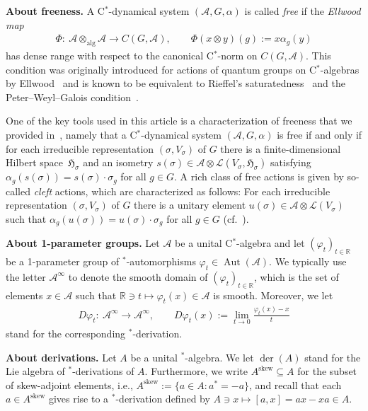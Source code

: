 \documentclass[10pt,a4paper]{amsart}
\numberwithin{equation}{section}
\newcommand*{\R}{\mathbb R}		%
\newcommand*{\tensor}{\otimes}		%
\DeclareMathOperator{\Aut}{Aut}
\DeclareMathOperator{\der}{der}
\newcommand*{\Star}{$^*$\nobreakdash}
\newcommand*{\hilb}{\mathfrak}		%
\newcommand*{\alg}{\mathcal}		%
\newcommand*{\hH}{\hilb{H}}			%
\newcommand*{\aA}{\alg{A}}			%
\newcommand*{\End}{\mathcal{L}} %
\newcommand*{\Cont}{C}
\begin{document}
{\bf About freeness.}
A C\Star-dynamical system $(\aA,G,\alpha)$ is called \emph{free} if the \emph{Ellwood map}
\begin{align*}
	\Phi\colon \ \aA \tensor_{\text{alg}} \aA \rightarrow C(G,\aA),
	\qquad
	\Phi(x\tensor y)(g):=x \alpha_g(y)
\end{align*}
has dense range with respect to the canonical C\Star-norm on $\Cont(G,\aA)$.
This condition was originally introduced for actions of quantum groups on C\Star-algebras by Ellwood~\cite{Ell00} and is known to be equivalent to Rieffel's saturatedness~\cite{Rieffel91} and the Peter--Weyl--Galois condition~\cite{BaCoHa15}.

One of the key tools used in this article is a characterization of freeness that we provided in~\cite[Lemma~3.3]{SchWa17c}, namely that a C\Star-dynamical system $(\aA,G,\alpha)$ is free if and only if for each irreducible representation $(\sigma,V_\sigma)$ of $G$ there is a finite-dimensional Hilbert space~$\hH_\sigma$ and an isometry $s(\sigma) \in \aA \tensor \End(V_\sigma,\hH_\sigma)$ satisfying $\alpha_g(s(\sigma))=s(\sigma) \cdot \sigma_g$ for all $g \in G$.
A rich class of free actions is given by so-called \emph{cleft} actions, which are characterized as follows:
For each irreducible representation $(\sigma,V_\sigma)$ of $G$ there is a unitary element \mbox{$u(\sigma) \in \aA \tensor \End(V_\sigma)$} such that $\alpha_g(u(\sigma))=u(\sigma) \cdot \sigma_g$ for all $g \in G$ (cf.~\cite[Definition~4.1]{SchWa17b}).

{\bf About 1-parameter groups.}
Let $\aA$ be a unital C\Star-algebra and let $(\varphi_t)_{t \in \R}$ be a 1\nobreakdash-parameter group of \Star-automorphisms $\varphi_t \in \Aut(\aA)$.
We typically use the letter $\aA^\infty$ to denote the smooth domain of $(\varphi_t)_{t \in \R}$, which is the set of elements $x \in \aA$ such that $\R \ni t \mapsto \varphi_t(x) \in \aA$ is smooth.
Moreover, we let
\begin{gather*}
	D \varphi_t \colon \ \aA^\infty \to \aA^\infty,
	\qquad
	D \varphi_t(x) := \lim_{t \to 0} \frac{\varphi_t(x)-x}{t}
\end{gather*}
stand for the corresponding \Star-derivation.

{\bf About derivations.}
Let $A$ be a unital \Star-algebra.
We let $\der(A)$ stand for the Lie algebra of \Star-derivations of $A$.
Furthermore, we write $A^\text{skew} \subseteq A$ for the subset of skew-adjoint elements, i.e., $A^{\text{skew}} := \{a \in A\colon a^* = -a \}$, and recall that each $a \in A^\text{skew}$ gives rise to a \Star-derivation defined by $A \ni x \mapsto [a,x] = ax -xa \in A$.
\end{document}

